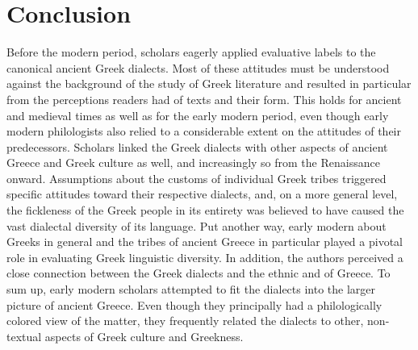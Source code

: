 \section{Conclusion}\label{sec:7.7}


Before the modern period, scholars eagerly applied evaluative labels to the canonical ancient Greek dialects. Most of these attitudes must be understood against the background of the study of Greek literature and resulted in particular from the perceptions readers had of texts and their form. This holds for ancient and medieval times as well as for the early modern period, even though early modern philologists also relied to a considerable extent on the attitudes of their predecessors. Scholars linked the Greek dialects with other aspects of ancient Greece and Greek culture as well, and increasingly so from the Renaissance onward. Assumptions about the customs of individual Greek tribes triggered specific attitudes toward their respective dialects, and, on a more general level, the fickleness of the Greek people in its entirety was believed to have caused the vast dialectal diversity of its language. Put another way, early modern  about Greeks in general and the tribes of ancient Greece in particular played a pivotal role in evaluating Greek linguistic diversity. In addition, the authors perceived a close connection between the Greek dialects and the ethnic and  of Greece. To sum up, early modern scholars attempted to fit the dialects into the larger picture of ancient Greece. Even though they principally had a philologically colored view of the matter, they frequently related the dialects to other, non-textual aspects of Greek culture and Greekness.

